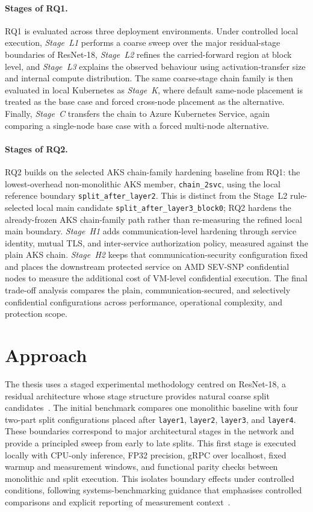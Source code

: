 \paragraph{Stages of RQ1.}
RQ1 is evaluated across three deployment environments. Under controlled local execution, \emph{Stage~L1} performs a coarse sweep over the major residual-stage boundaries of ResNet-18, \emph{Stage~L2} refines the carried-forward region at block level, and \emph{Stage~L3} explains the observed behaviour using activation-transfer size and internal compute distribution. The same coarse-stage chain family is then evaluated in local Kubernetes as \emph{Stage~K}, where default same-node placement is treated as the base case and forced cross-node placement as the alternative. Finally, \emph{Stage~C} transfers the chain to Azure Kubernetes Service, again comparing a single-node base case with a forced multi-node alternative.

\paragraph{Stages of RQ2.}
RQ2 builds on the selected AKS chain-family hardening baseline from RQ1:
the lowest-overhead non-monolithic AKS member, \texttt{chain\_2svc}, using
the local reference boundary \texttt{split\_after\_layer2}. This is distinct
from the Stage~L2 rule-selected local main candidate
\texttt{split\_after\_layer3\_block0}; RQ2 hardens the already-frozen AKS
chain-family path rather than re-measuring the refined local main boundary.
\emph{Stage~H1} adds communication-level hardening through service identity, mutual TLS, and inter-service authorization policy, measured against the plain AKS chain. \emph{Stage~H2} keeps that communication-security configuration fixed and places the downstream protected service on AMD SEV-SNP confidential nodes to measure the additional cost of VM-level confidential execution. The final trade-off analysis compares the plain, communication-secured, and selectively confidential configurations across performance, operational complexity, and protection scope.

\section{Approach}
The thesis uses a staged experimental methodology centred on ResNet-18, a residual architecture whose stage structure provides natural coarse split candidates~\cite{resnet}. The initial benchmark compares one monolithic baseline with four two-part split configurations placed after \texttt{layer1}, \texttt{layer2}, \texttt{layer3}, and \texttt{layer4}. These boundaries correspond to major architectural stages in the network and provide a principled sweep from early to late splits. This first stage is executed locally with CPU-only inference, FP32 precision, gRPC over localhost, fixed warmup and measurement windows, and functional parity checks between monolithic and split execution. This isolates boundary effects under controlled conditions, following systems-benchmarking guidance that emphasises controlled comparisons and explicit reporting of measurement context~\cite{benchmarking_sc15}.

